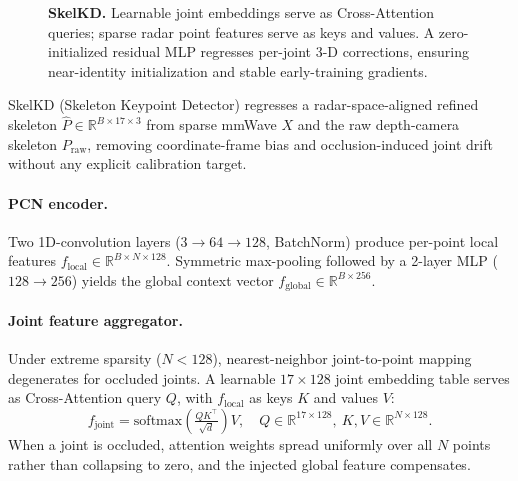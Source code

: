 \documentclass{article}
\newcommand{\Rbb}{\mathbb{R}}
\begin{document}
\begin{figure}[t]
  \centering
  \caption{
    \textbf{SkelKD.}
    Learnable joint embeddings serve as Cross-Attention queries;
    sparse radar point features serve as keys and values.
    A zero-initialized residual MLP regresses per-joint 3-D corrections,
    ensuring near-identity initialization and stable early-training gradients.
  }
  \label{fig:skelkd}
\end{figure}

SkelKD (Skeleton Keypoint Detector) regresses a radar-space-aligned refined
skeleton $\hat{P}\!\in\!\Rbb^{B\times17\times3}$ from sparse mmWave $X$ and
the raw depth-camera skeleton $P_\text{raw}$, removing coordinate-frame bias
and occlusion-induced joint drift without any explicit calibration target.

\paragraph{PCN encoder.}
Two 1D-convolution layers ($3\!\to\!64\!\to\!128$, BatchNorm) produce per-point
local features $f_\text{local}\!\in\!\Rbb^{B\times N\times128}$.
Symmetric max-pooling followed by a 2-layer MLP ($128\!\to\!256$) yields the
global context vector $f_\text{global}\!\in\!\Rbb^{B\times256}$.

\paragraph{Joint feature aggregator.}
Under extreme sparsity ($N\!<\!128$), nearest-neighbor joint-to-point mapping
degenerates for occluded joints.
A learnable $17\!\times\!128$ joint embedding table serves as Cross-Attention
query $Q$, with $f_\text{local}$ as keys $K$ and values $V$:
\begin{equation}
  f_\text{joint} = \mathrm{softmax}\!\left(\tfrac{QK^\top}{\sqrt{d}}\right)V,
  \quad Q\!\in\!\Rbb^{17\times128},\ K,V\!\in\!\Rbb^{N\times128}.
\end{equation}
When a joint is occluded, attention weights spread uniformly over all $N$ points
rather than collapsing to zero, and the injected global feature compensates.
\end{document}
